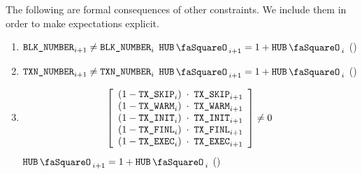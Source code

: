 The following are formal consequences of other constraints.
We include them in order to make expectations explicit.
\begin{enumerate}
	\item \If $\texttt{BLK\_NUMBER}       _{i + 1} \neq \texttt{BLK\_NUMBER}       _{i}$ \Then $\hubStamp _{i + 1} = 1 + \hubStamp _{i}$ (\sanityCheck)
	\item \If $\texttt{TXN\_NUMBER} _{i + 1} \neq \texttt{TXN\_NUMBER} _{i}$ \Then $\hubStamp _{i + 1} = 1 + \hubStamp _{i}$ (\sanityCheck)
        \item \If
		\[
			\left[ \begin{array}{lcl}
				(1 - \txSkip _{i}) & \!\!\!\cdot\!\!\! & \txSkip _{i + 1} \\
				(1 - \txWarm _{i}) & \!\!\!\cdot\!\!\! & \txWarm _{i + 1} \\
				(1 - \txInit _{i}) & \!\!\!\cdot\!\!\! & \txInit _{i + 1} \\
				(1 - \txFinl _{i}) & \!\!\!\cdot\!\!\! & \txFinl _{i + 1} \\
				(1 - \txExec _{i}) & \!\!\!\cdot\!\!\! & \txExec _{i + 1} \\
			\end{array} \right]
			\neq 0
		\]
		\Then $\hubStamp _{i + 1} = 1 + \hubStamp _{i}$ (\sanityCheck)
\end{enumerate}
